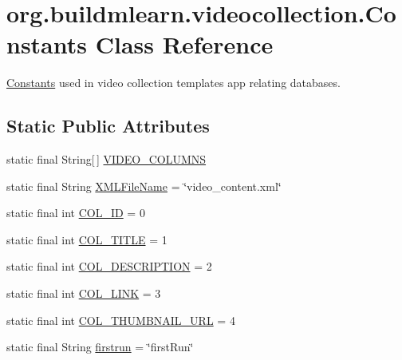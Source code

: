 \hypertarget{classorg_1_1buildmlearn_1_1videocollection_1_1Constants}{}\section{org.\+buildmlearn.\+videocollection.\+Constants Class Reference}
\label{classorg_1_1buildmlearn_1_1videocollection_1_1Constants}


\hyperlink{classorg_1_1buildmlearn_1_1videocollection_1_1Constants}{Constants} used in video collection template\textquotesingle{}s app relating databases.  


\subsection*{Static Public Attributes}
\begin{DoxyCompactItemize}
\item 
static final String\mbox{[}$\,$\mbox{]} \hyperlink{classorg_1_1buildmlearn_1_1videocollection_1_1Constants_add550b0eba9669cf5ab4f1a7c479881e}{V\+I\+D\+E\+O\+\_\+\+C\+O\+L\+U\+M\+NS}
\item 
static final String \hyperlink{classorg_1_1buildmlearn_1_1videocollection_1_1Constants_a868f215414c7df72f4155d1a69d2a79a}{X\+M\+L\+File\+Name} = \char`\"{}video\+\_\+content.\+xml\char`\"{}
\item 
static final int \hyperlink{classorg_1_1buildmlearn_1_1videocollection_1_1Constants_affae365dc9822127e48492c8d85963b8}{C\+O\+L\+\_\+\+ID} = 0
\item 
static final int \hyperlink{classorg_1_1buildmlearn_1_1videocollection_1_1Constants_a8a43757751106e74dca40d0deed953c0}{C\+O\+L\+\_\+\+T\+I\+T\+LE} = 1
\item 
static final int \hyperlink{classorg_1_1buildmlearn_1_1videocollection_1_1Constants_af47aef26f1197013f8efe0116e91736f}{C\+O\+L\+\_\+\+D\+E\+S\+C\+R\+I\+P\+T\+I\+ON} = 2
\item 
static final int \hyperlink{classorg_1_1buildmlearn_1_1videocollection_1_1Constants_a34230717b8ec4c99d4d26e7655135533}{C\+O\+L\+\_\+\+L\+I\+NK} = 3
\item 
static final int \hyperlink{classorg_1_1buildmlearn_1_1videocollection_1_1Constants_af55e3321e6e5e691d1cf9aa0af3b000b}{C\+O\+L\+\_\+\+T\+H\+U\+M\+B\+N\+A\+I\+L\+\_\+\+U\+RL} = 4
\item 
static final String \hyperlink{classorg_1_1buildmlearn_1_1videocollection_1_1Constants_af17a03dffa6325ff454d262e84084259}{firstrun} = \char`\"{}first\+Run\char`\"{}
\end{DoxyCompactItemize}


